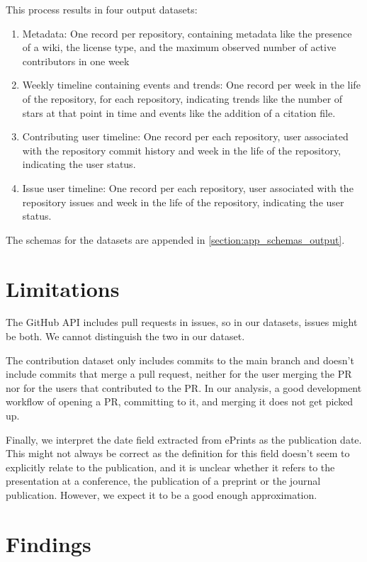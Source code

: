 \documentclass[10pt,a4paper]{scrartcl}
\begin{document}
This process results in four output datasets:
\begin{enumerate}
    \item Metadata: One record per repository, containing metadata like the presence of a wiki, the license type, and the maximum observed number of active contributors in one week
    \item Weekly timeline containing events and trends: One record per week in the life of the repository, for each repository, indicating trends like the number of stars at that point in time and events like the addition of a citation file.
    \item Contributing user timeline: One record per each repository, user associated with the repository commit history and week in the life of the repository, indicating the user status.
    \item Issue user timeline: One record per each repository, user associated with the repository issues and week in the life of the repository, indicating the user status.
\end{enumerate}

The schemas for the datasets are appended in \ref{section:app_schemas_output}.

\section{Limitations}

The GitHub API includes pull requests in issues, so in our datasets, issues might be both.
We cannot distinguish the two in our dataset.

The contribution dataset only includes commits to the main branch and doesn't include commits that merge a pull request, neither for the user merging the PR nor for the users that contributed to the PR.
In our analysis, a good development workflow of opening a PR, committing to it, and merging it does not get picked up.

Finally, we interpret the date field extracted from ePrints as the publication date.
This might not always be correct as the definition for this field doesn't seem to explicitly relate to the publication,
and it is unclear whether it refers to the presentation at a conference, the publication of a preprint or the journal publication.
However, we expect it to be a good enough approximation. 

\section{Findings}
\end{document}
